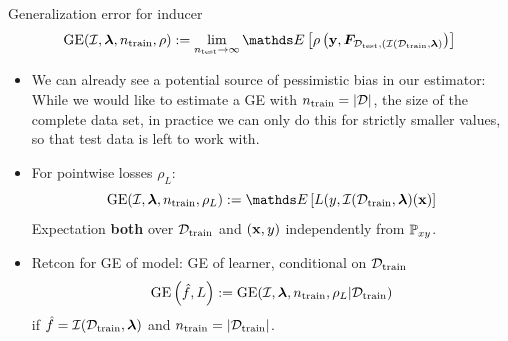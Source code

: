 \documentclass[11pt,compress,t,notes=noshow, xcolor=table]{beamer}
\begin{document}
\begin{vbframe}{Generalization error for inducer}
  $$\GEfull := 
  \lim_{\ntest \rightarrow \infty} \E \left[ \rho \left(
  \yv, \F_{\Dtest, (\ind(\D_{\mathrm{train}}, \lamv)} 
  \right)\right]$$
\begin{itemize}
  \item We can already see a potential source of pessimistic bias in our
      estimator: While we would like to estimate a GE with 
      $n_{\mathrm{train}} = |\mathcal{D}|$, the size of the complete data set, 
      in practice we can only do this for strictly smaller values, so that test data is left to work with.
  \item For pointwise losses $\rho_L$:
      $$\GE(\ind, \lamv, n_\mathrm{train}, \rho_L) := 
      \E \left[ L(y, \ind(\D_{\mathrm{train}}, \lamv)(\xv) \right]$$
  Expectation \textbf{both} over $\mathcal{D}_{\text{train}}$ and $(\mathbf{x},y)$ independently from $\mathbb{P}_{xy}$.
 \item Retcon for GE of model: GE of learner, conditional on $\mathcal{D}_{\text{train}}$
     $$\mathrm{GE}\left(\hat{f}, L\right) := \mathrm{GE}(\mathcal{I}, \bm{\lambda}, n_{\mathrm{train}}, \rho_L | \mathcal{D}_{\text{train}}) $$
   if $\hat{f} = \mathcal{I}(\mathcal{D}_{\text{train}}, \bm{\lambda})$ and $n_\mathrm{train} = |\mathcal{D}_{\text{train}}|$.
\end{itemize}



\end{vbframe}







\endlecture
\end{document}

